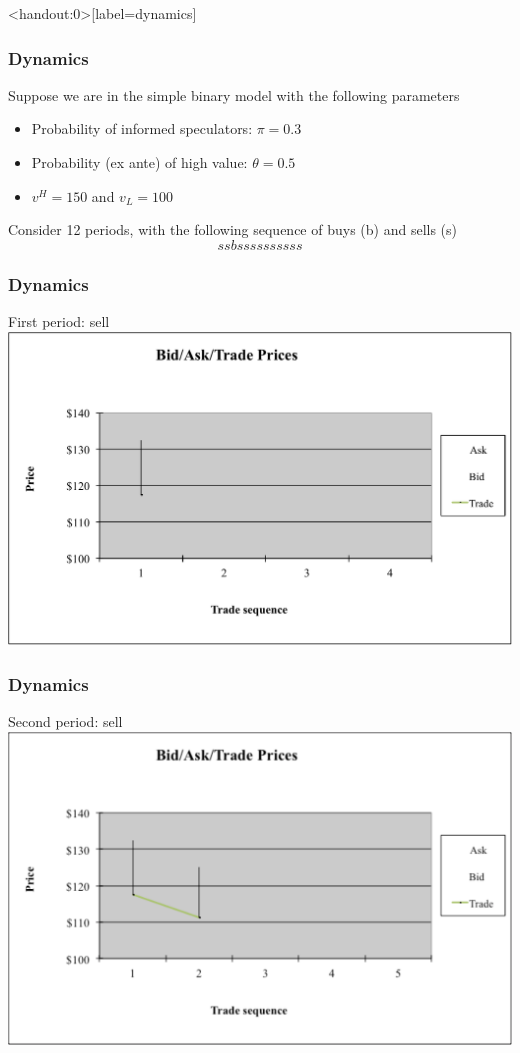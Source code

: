 \begin{frame}<handout:0>[label=dynamics]
	\frametitle{Dynamics}
	Suppose we are in the simple binary model with the following parameters
	\begin{itemize}
		\item Probability of informed speculators: $\pi = 0.3$
		\item Probability (ex ante) of high value: $\theta = 0.5$
		\item $v^H=150$ and $v_L=100$
	\end{itemize}
	Consider 12 periods, with the following sequence of buys (b) and sells (s)
	\[
	ssbssssssssss
	\]
\end{frame}


\begin{frame}
	\frametitle{Dynamics}
	First period: sell
	\center
	\includegraphics[width=0.9\linewidth]{pics/P1_Image.pdf}
\end{frame}


\begin{frame} [noframenumbering]
	\frametitle{Dynamics}
	Second period: sell
	\center
	\includegraphics[width=0.9\linewidth]{pics/P2_Image.pdf}
\end{frame}


